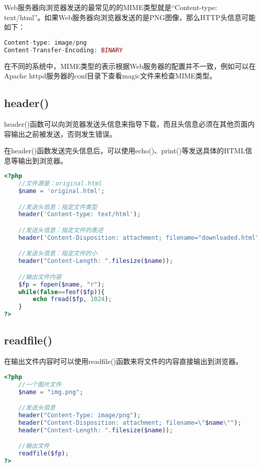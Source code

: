 Web服务器向浏览器发送的最常见的的MIME类型就是“Content-type: text/html”。如果Web服务器向浏览器发送的是PNG图像，那么HTTP头信息可能如下：

\begin{lstlisting}[language=PHP]
Content-type: image/png
Content-Transfer-Encoding: BINARY
\end{lstlisting}


在不同的系统中，MIME类型的表示根据Web服务器的配置并不一致，例如可以在Apache httpd服务器的conf目录下查看magic文件来检查MIME类型。

\subsection{header()}

header()函数可以向浏览器发送头信息来指导下载，而且头信息必须在其他页面内容输出之前被发送，否则发生错误。

在header()函数发送完头信息后，可以使用echo()、print()等发送具体的HTML信息等输出到浏览器。




\begin{lstlisting}[language=PHP]
<?php
	//文件源是：original.html
	$name = 'original.html';

	//发送头信息：指定文件类型
	header('Content-type: text/html');

	//发送头信息：指定文件的表述
	header('Content-Disposition: attachment; filename="downloaded.html"');

	//发送头信息：指定文件的小
	header("Content-Length: ".filesize($name));

	//输出文件内容
	$fp = fopen($name, "r");
	while(false==feof($fp)){
		echo fread($fp, 1024);
	}
?>
\end{lstlisting}


\subsection{readfile()}




在输出文件内容时可以使用readfile()函数来将文件的内容直接输出到浏览器。


\begin{lstlisting}[language=PHP]
<?php
	//一个图片文件
	$name = "img.png";

	//发送头信息
	header("Content-Type: image/png");
	header("Content-Disposition: attachment; filename=\"$name\"");
	header("Content-Length: ".filesize($name));

	//输出文件
	readfile($fp);
?>
\end{lstlisting}






